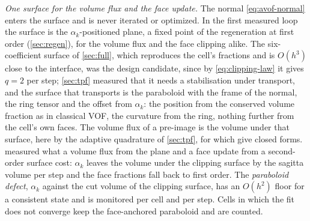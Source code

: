 \documentclass[preprint,12pt]{elsarticle}
\begin{document}
\emph{One surface for the volume flux and the face update.} The normal \cref{eq:avof-normal} enters the surface and is never iterated or optimized. In the first measured loop the surface is the $\alpha_k$-positioned plane, a fixed point of the regeneration at first order (\cref{sec:regen}), for the volume flux and the face clipping alike. The six-coefficient surface of \cref{sec:full}, which reproduces the cell's fractions and is $O(h^3)$ close to the interface, was the design candidate, since by \cref{eq:clipping-law} it gives $q = 2$ per step; \cref{sec:tpf} measured that it needs a stabilisation under transport, and the surface that transports is the paraboloid with the frame of the normal, the ring tensor and the offset from $\alpha_k$: the position from the conserved volume fraction as in classical VOF, the curvature from the ring, nothing further from the cell's own faces. The volume flux of a pre-image is the volume under that surface, here by the adaptive quadrature of \cref{sec:tpf}, for which \citet{EvrardChiodiHanVanWachemDesjardins2023} give closed forms.  measured what a volume flux from the plane and a face update from a second-order surface cost: $\alpha_k$ leaves the volume under the clipping surface by the sagitta volume per step and the face fractions fall back to first order. The \emph{paraboloid defect}, $\alpha_k$ against the cut volume of the clipping surface, has an $O(h^2)$ floor for a consistent state and is monitored per cell and per step. Cells in which the fit does not converge keep the face-anchored paraboloid and are counted.
\end{document}
